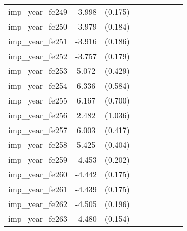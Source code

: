{\begin{tabular}{l*{4}{cc}}
imp\_year\_fe249&   -3.998\sym{***}&  (0.175)&                  &         &                  &         &                  &         \\
imp\_year\_fe250&   -3.979\sym{***}&  (0.184)&                  &         &                  &         &                  &         \\
imp\_year\_fe251&   -3.916\sym{***}&  (0.186)&                  &         &                  &         &                  &         \\
imp\_year\_fe252&   -3.757\sym{***}&  (0.179)&                  &         &                  &         &                  &         \\
imp\_year\_fe253&    5.072\sym{***}&  (0.429)&                  &         &                  &         &                  &         \\
imp\_year\_fe254&    6.336\sym{***}&  (0.584)&                  &         &                  &         &                  &         \\
imp\_year\_fe255&    6.167\sym{***}&  (0.700)&                  &         &                  &         &                  &         \\
imp\_year\_fe256&    2.482\sym{*}  &  (1.036)&                  &         &                  &         &                  &         \\
imp\_year\_fe257&    6.003\sym{***}&  (0.417)&                  &         &                  &         &                  &         \\
imp\_year\_fe258&    5.425\sym{***}&  (0.404)&                  &         &                  &         &                  &         \\
imp\_year\_fe259&   -4.453\sym{***}&  (0.202)&                  &         &                  &         &                  &         \\
imp\_year\_fe260&   -4.442\sym{***}&  (0.175)&                  &         &                  &         &                  &         \\
imp\_year\_fe261&   -4.439\sym{***}&  (0.175)&                  &         &                  &         &                  &         \\
imp\_year\_fe262&   -4.505\sym{***}&  (0.196)&                  &         &                  &         &                  &         \\
imp\_year\_fe263&   -4.480\sym{***}&  (0.154)&                  &         &                  &         &                  &         \\

\end{tabular}}
